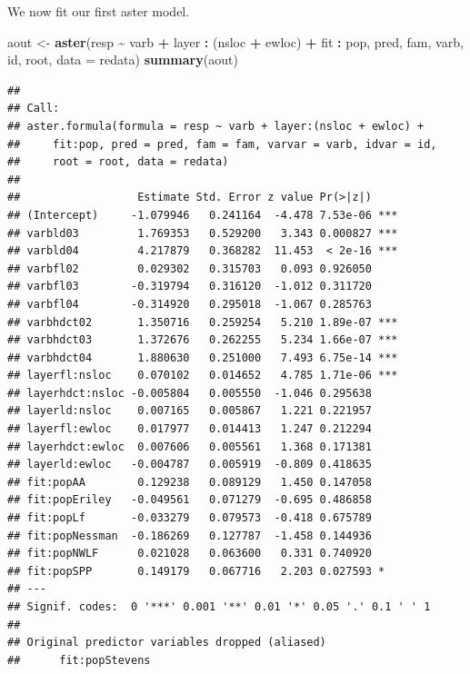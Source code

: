 \documentclass[
  ignorenonframetext,
]{beamer}
\newenvironment{Shaded}{\begin{snugshade}}{\end{snugshade}}
\newcommand{\AttributeTok}[1]{\textcolor[rgb]{0.13,0.29,0.53}{#1}}
\newcommand{\FunctionTok}[1]{\textcolor[rgb]{0.13,0.29,0.53}{\textbf{#1}}}
\newcommand{\NormalTok}[1]{#1}
\newcommand{\OtherTok}[1]{\textcolor[rgb]{0.56,0.35,0.01}{#1}}
\newcommand{\SpecialCharTok}[1]{\textcolor[rgb]{0.81,0.36,0.00}{\textbf{#1}}}
\begin{document}
\begin{frame}[fragile]{}
\protect\hypertarget{section-19}{}
We now fit our first aster model.

\vspace{12pt}
\tiny

\begin{Shaded}
\begin{Highlighting}[]
\NormalTok{aout }\OtherTok{\textless{}{-}} \FunctionTok{aster}\NormalTok{(resp }\SpecialCharTok{\textasciitilde{}}\NormalTok{ varb }\SpecialCharTok{+}\NormalTok{ layer }\SpecialCharTok{:}\NormalTok{ (nsloc }\SpecialCharTok{+}\NormalTok{ ewloc) }\SpecialCharTok{+} 
\NormalTok{                            fit }\SpecialCharTok{:}\NormalTok{ pop, pred, fam, varb, id, root, }\AttributeTok{data =}\NormalTok{ redata)}
\FunctionTok{summary}\NormalTok{(aout)}
\end{Highlighting}
\end{Shaded}

\begin{verbatim}
## 
## Call:
## aster.formula(formula = resp ~ varb + layer:(nsloc + ewloc) + 
##     fit:pop, pred = pred, fam = fam, varvar = varb, idvar = id, 
##     root = root, data = redata)
## 
##                  Estimate Std. Error z value Pr(>|z|)    
## (Intercept)     -1.079946   0.241164  -4.478 7.53e-06 ***
## varbld03         1.769353   0.529200   3.343 0.000827 ***
## varbld04         4.217879   0.368282  11.453  < 2e-16 ***
## varbfl02         0.029302   0.315703   0.093 0.926050    
## varbfl03        -0.319794   0.316120  -1.012 0.311720    
## varbfl04        -0.314920   0.295018  -1.067 0.285763    
## varbhdct02       1.350716   0.259254   5.210 1.89e-07 ***
## varbhdct03       1.372676   0.262255   5.234 1.66e-07 ***
## varbhdct04       1.880630   0.251000   7.493 6.75e-14 ***
## layerfl:nsloc    0.070102   0.014652   4.785 1.71e-06 ***
## layerhdct:nsloc -0.005804   0.005550  -1.046 0.295638    
## layerld:nsloc    0.007165   0.005867   1.221 0.221957    
## layerfl:ewloc    0.017977   0.014413   1.247 0.212294    
## layerhdct:ewloc  0.007606   0.005561   1.368 0.171381    
## layerld:ewloc   -0.004787   0.005919  -0.809 0.418635    
## fit:popAA        0.129238   0.089129   1.450 0.147058    
## fit:popEriley   -0.049561   0.071279  -0.695 0.486858    
## fit:popLf       -0.033279   0.079573  -0.418 0.675789    
## fit:popNessman  -0.186269   0.127787  -1.458 0.144936    
## fit:popNWLF      0.021028   0.063600   0.331 0.740920    
## fit:popSPP       0.149179   0.067716   2.203 0.027593 *  
## ---
## Signif. codes:  0 '***' 0.001 '**' 0.01 '*' 0.05 '.' 0.1 ' ' 1
## 
## Original predictor variables dropped (aliased)
##      fit:popStevens
\end{verbatim}
\end{frame}
\end{document}

